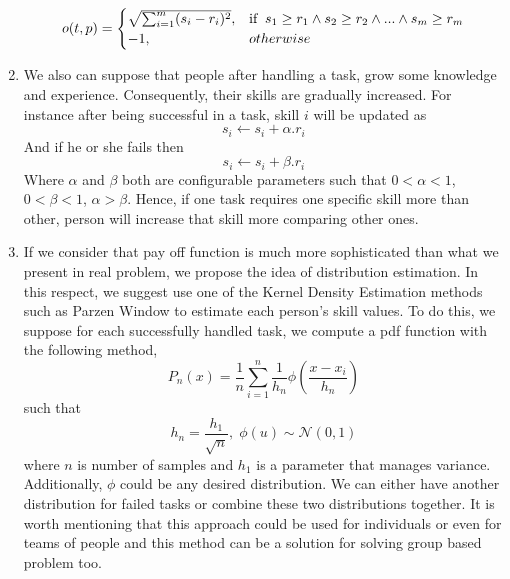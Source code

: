 \documentclass[]{article}
\begin{document}
\begin{enumerate}
\begin{equation}
	\end{equation}
	\begin{equation*}
		o(t,p) = 
		\begin{cases}
		\sqrt{\sum_{i=1}^{m}(s_i-r_i)^2},	& \text{if\;\;} s_1 \geq r_1 \wedge s_2 \geq r_2 \wedge ... \wedge s_m \geq r_m\\
		-1,	& otherwise
		\end{cases}
	\end{equation*}
	\item We also can suppose that people after handling a task, grow some knowledge and experience. Consequently, their skills are gradually increased. For instance after being successful in a task, skill $i$ will be updated as
	\begin{equation}
		s_i \leftarrow s_i + \alpha.r_i
	\end{equation}
	And if he or she fails then
	\begin{equation}
		s_i \leftarrow s_i + \beta.r_i
	\end{equation}
	Where $\alpha$ and $\beta$ both are configurable parameters such that $0<\alpha<1$, $0<\beta<1$,  $\alpha>\beta$. Hence, if one task requires one specific skill more than other, person will increase that skill more comparing other ones.
	\item If we consider that pay off function is much more sophisticated than what we present in real problem, we propose the idea of distribution estimation. In this respect, we suggest use one of the Kernel Density Estimation methods such as Parzen Window \cite{katkovnik2002kernel} to estimate each person's skill values. To do this, we suppose for each successfully handled task, we compute a pdf function with the following method,
	\begin{equation}
		P_n(x) = \frac{1}{n}\sum_{i=1}^{n}\frac{1}{h_n}\phi(\frac{x-x_i}{h_n})
	\end{equation}
	such that
	\begin{equation*}
		h_n = \frac{h_1}{\sqrt{n}},\;
		\phi(u)\sim \mathcal{N}(0,1)
	\end{equation*}
	where $n$ is number of samples and $h_1$ is a parameter that manages variance. Additionally, $\phi$ could be any desired distribution. We can either have another distribution for failed tasks or combine these two distributions together. It is worth mentioning that this approach could be used for individuals or even for teams of people and this method can be a solution for solving group based problem too.
	
\end{enumerate}



\end{document}
